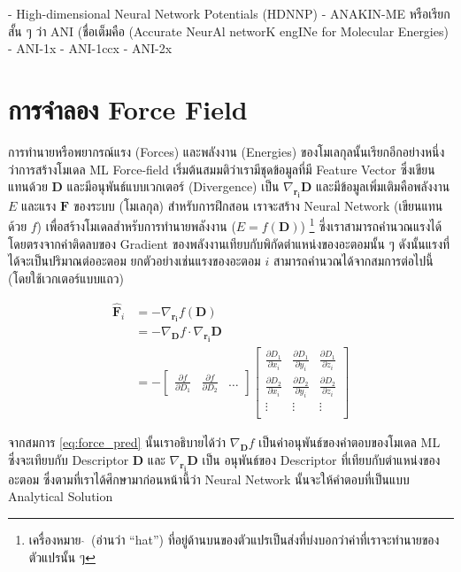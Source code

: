 - High-dimensional Neural Network Potentials (HDNNP)\cite{behler2007}
- ANAKIN-ME หรือเรียกสั้น ๆ ว่า ANI (ชื่อเต็มคือ (Accurate NeurAl networK engINe for Molecular Energies)
    - ANI-1x\cite{smith2017}
    - ANI-1ccx\cite{smith2018}
    - ANI-2x\cite{smith2019}

\section{การจำลอง Force Field}

การทำนายหรือพยากรณ์แรง (Forces) และพลังงาน (Energies) ของโมเลกุลนั้นเรียกอีกอย่างหนึ่งว่าการสร้างโมเดล ML Force-field 
เริ่มต้นสมมติว่าเรามีชุดข้อมูลที่มี Feature Vector ซึ่งเขียนแทนด้วย $\mathbf{D}$ และมีอนุพันธ์แบบเวกเตอร์ (Divergence) เป็น 
$\nabla_{\mathbf{r_i}} \mathbf{D}$ และมีข้อมูลเพิ่มเติมคือพลังงาน $E$ และแรง $\mathbf{F}$ ของระบบ (โมเลกุล) สำหรับการฝึกสอน
เราจะสร้าง Neural Network (เขียนแทนด้วย $f$) เพื่อสร้างโมเดลสำหรับการทำนายพลังงาน ($\hat{E} = f(\mathbf{D})$)
\footnote{เครื่องหมาย $\hat{}$\, (อ่านว่า \enquote{hat}) ที่อยู่ด้านบนของตัวแปรเป็นส่งที่บ่งบอกว่าค่าที่เราจะทำนายของตัวแปรนั้น ๆ}
ซึ่งเราสามารถคำนวณแรงได้โดยตรงจากค่าติดลบของ Gradient ของพลังงานเทียบกับพิกัดตำแหน่งของอะตอมนั้น ๆ ดังนั้นแรงที่ได้จะเป็นปริมาณต่ออะตอม
ยกตัวอย่างเช่นแรงของอะตอม $i$ สามารถคำนวณได้จากสมการต่อไปนี้ (โดยใช้เวกเตอร์แบบแถว)

\begin{align}\label{eq:force_pred}
\hat{\mathbf{F}}_i &= - \nabla_{\mathbf{r_i}} f(\mathbf{D}) \\
&= - \nabla_{\mathbf{D}} f \cdot \nabla_{\mathbf{r_i}} \mathbf{D}\\
&= - \begin{bmatrix}
    \frac{\partial f}{\partial D_1} & \frac{\partial f}{\partial D_2} & \dots
\end{bmatrix}
\begin{bmatrix}
    \frac{\partial D_1}{\partial x_i} & \frac{\partial D_1}{\partial y_i} & \frac{\partial D_1}{\partial z_i}\\
    \frac{\partial D_2}{\partial x_i} & \frac{\partial D_2}{\partial y_i} & \frac{\partial D_2}{\partial z_i}\\
    \vdots & \vdots & \vdots \\
\end{bmatrix}
\end{align}

จากสมการ \ref{eq:force_pred} นั้นเราอธิบายได้ว่า $\nabla_{\mathbf{D}} f$ เป็นค่าอนุพันธ์ของคำตอบของโมเดล ML ซึ่งจะเทียบกับ
Descriptor $\mathbf{D}$ และ $\nabla_{\mathbf{r_i}} \mathbf{D}$ เป็น อนุพันธ์ของ Descriptor ที่เทียบกับตำแหน่งของอะตอม
ซึ่งตามที่เราได้ศึกษามาก่อนหน้านี้ว่า Neural Network นั้นจะให้คำตอบที่เป็นแบบ Analytical Solution

